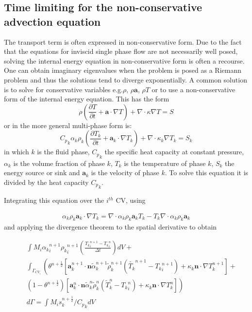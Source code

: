 \subsection{Time limiting for the non-conservative advection equation}

The transport term is often expressed in non-conservative form. Due to the fact that the equations for inviscid single phase flow are not necessarily well posed, solving the internal energy equation in non-conservative form is often a recourse.  One can obtain imaginary eigenvalues when the problem is posed as a Riemann problem and thus the solutions tend to diverge exponentially. A common solution is to solve for conservative variables e.g.$\rho$, $\rho\mathbf{a}$, $\rho T$ or to use a non-conservative form of the internal energy equation. This has the form 
\begin{equation}
\rho \left( \frac{\partial T}{\partial t} + \mathbf{a}\cdot\nabla
T \right) + \nabla \cdot \kappa\nabla T  = S
\end{equation}
or in the more general multi-phase form is:
\begin{equation}
{C_p}_k \alpha_k \rho_k \left( \frac{\partial T_k}{\partial t} + \mathbf{a}_k\cdot\nabla
T_k \right) + \nabla \cdot \kappa_k \nabla T_k  = S_k
\label{multiT}
\end{equation}
in which $k$ is the fluid phase, ${C_p}_k$ the specific heat capacity at constant pressure, $\alpha_k$ is the volume fraction of phase $k$, $T_k$ is the temperature of phase $k$, $S_k$ the energy source or sink and $\mathbf{a}_k$ is the velocity of phase $k$. To solve this equation it is divided by the heat capacity ${C_p}_k$.

Integrating this equation over the $i^{th}$ CV, using

\begin{eqnarray}
\alpha_k \rho_k
\mathbf{a}_k \cdot \nabla T_k = \nabla \cdot \alpha_k\rho_k \mathbf{a}_k T_k - T_k\nabla\cdot \alpha_k \rho_k \mathbf{a}_k
\label{parts}
\end{eqnarray}
and applying the divergence theorem to the spatial derivative to obtain

\begin{eqnarray}
&&\int M_{i} {\alpha_k}_i^{n+1} {\rho_k}_{i}^{n+1} \left(
\frac{{T_k}_{i}^{n+1}-{T_k}_{i}^{n}}{\Delta t} \right)  dV +
\nonumber\\
&&\int_{\Gamma_{CV_{i}}} \left(\theta^{n+\frac{1}{2}} \left[
\mathbf{a}^{n+1}_k \cdot \mathbf{n} {\widetilde{\alpha}}_k^{n+1}
{\widetilde{\rho}}_k^{n+1} (\widetilde{T_k}^{n+1}-{T_k}_i^{n+1})
+\kappa_k \mathbf{n}\cdot \nabla T^{n+1}_k \right]\right. +\nonumber\\
&&\left.(1-\theta^{n+\frac{1}{2}} )\left[ \mathbf{a}^{n}_k \cdot
\mathbf{n} {\widetilde{\alpha}}_k^{n} {\widetilde{\rho}}_k^{n}
(\widetilde{T}^{n}_k-{T_k}_i^{n}) +\kappa_k \mathbf{n}\cdot \nabla
T^{n}_k \right]\right)\nonumber\\
&&d\Gamma = \int M_{i} s_k^{n+\frac{1}{2}}/{C_p}_k dV
\label{nocons}
\end{eqnarray}


